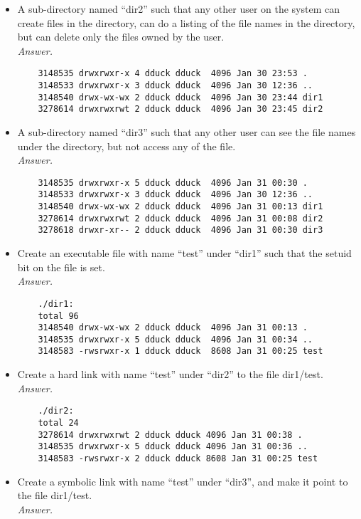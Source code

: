 \documentclass[11pt]{article}
\begin{document}
\begin{description}
\begin{itemize}
\begin{verbatim}
\end{verbatim}
 \item
A sub-directory named ``dir2'' such that any other user on the system can create files in the directory, can do a listing of the file names in the directory, but can delete only the files owned by the user.
\\\textit{Answer. }
\begin{verbatim}
	3148535 drwxrwxr-x 4 dduck dduck  4096 Jan 30 23:53 .
	3148533 drwxrwxr-x 3 dduck dduck  4096 Jan 30 12:36 ..
	3148540 drwx-wx-wx 2 dduck dduck  4096 Jan 30 23:44 dir1
	3278614 drwxrwxrwt 2 dduck dduck  4096 Jan 30 23:45 dir2
\end{verbatim}
 \item
A sub-directory named ``dir3'' such that any other user can see the file names under the directory, but not access any of the file.
\\\textit{Answer. }
\begin{verbatim}
	3148535 drwxrwxr-x 5 dduck dduck  4096 Jan 31 00:30 .
	3148533 drwxrwxr-x 3 dduck dduck  4096 Jan 30 12:36 ..
	3148540 drwx-wx-wx 2 dduck dduck  4096 Jan 31 00:13 dir1
	3278614 drwxrwxrwt 2 dduck dduck  4096 Jan 31 00:08 dir2
	3278618 drwxr-xr-- 2 dduck dduck  4096 Jan 31 00:30 dir3
\end{verbatim}
 \item
Create an executable file with name ``test'' under ``dir1'' such that the setuid bit on the file is set.  
\\\textit{Answer. }
\begin{verbatim}
	./dir1:
	total 96
	3148540 drwx-wx-wx 2 dduck dduck  4096 Jan 31 00:13 .
	3148535 drwxrwxr-x 5 dduck dduck  4096 Jan 31 00:34 ..
	3148583 -rwsrwxr-x 1 dduck dduck  8608 Jan 31 00:25 test
\end{verbatim}
 \item
Create a hard link with name ``test'' under ``dir2'' to the file dir1/test.
\\\textit{Answer. }
\begin{verbatim}
	./dir2:
	total 24
	3278614 drwxrwxrwt 2 dduck dduck 4096 Jan 31 00:38 .
	3148535 drwxrwxr-x 5 dduck dduck 4096 Jan 31 00:36 ..
	3148583 -rwsrwxr-x 2 dduck dduck 8608 Jan 31 00:25 test
\end{verbatim}
 \item
Create a symbolic link with name ``test'' under ``dir3'', and make it point to the file dir1/test.
\\
\textit{Answer.}
\begin{verbatim}

\end{verbatim}
\end{itemize}
\end{description}
\end{document}
